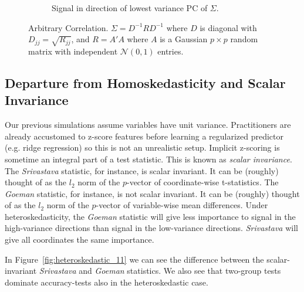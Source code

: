 \documentclass[]{bio}
\begin{document}
\begin{figure}[h]
\begin{subfigure}[t]{.45\columnwidth}
		\caption{Signal in direction of lowest variance PC of $\Sigma$.} 
		\label{fig:dependence_32}
	\end{subfigure}
	\caption{Arbitrary Correlation. 
		$\Sigma=D^{-1} R D^{-1}$ where $D$ is diagonal with $D_{jj}=\sqrt{R_{jj}}$, and $R=A'A$ where $A$ is a Gaussian $p\times p$ random matrix with independent $\mathcal{N}(0,1)$ entries.
	}
	\label{fig:dependence_3}
\end{figure}



\subsection{Departure from Homoskedasticity and Scalar Invariance}

Our previous simulations assume variables have unit variance. 
Practitioners are already accustomed to z-score features before learning a regularized predictor (e.g. ridge regression) so this is not an unrealistic setup.
Implicit z-scoring is sometime an integral part of a test statistic. 
This is known as \emph{scalar invariance}.
The \emph{Srivastava} statistic, for instance, is scalar invariant. 
It can be (roughly) thought of as the $l_2$ norm of the $p$-vector of coordinate-wise t-statistics.
The \emph{Goeman} statistic, for instance, is not scalar invariant. 
It can be (roughly) thought of as the $l_2$ norm of the $p$-vector of variable-wise mean differences.
Under heteroskedasticity, the \emph{Goeman} statistic will give less importance to signal in the high-variance directions than signal in the low-variance directions. \emph{Srivastava} will give all coordinates the same importance.

In Figure~\ref{fig:heteroskedastic_11} we can see the difference between the scalar-invariant \emph{Srivastava} and \emph{Goeman} statistics. We also see that two-group tests dominate accuracy-tests also in the heteroskedastic case. 
\end{document}
